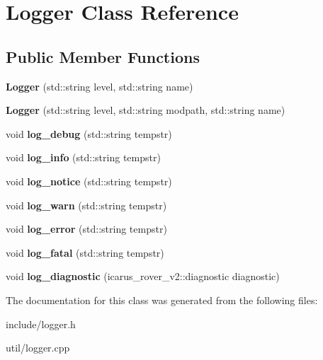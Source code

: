 \hypertarget{classLogger}{}\section{Logger Class Reference}
\label{classLogger}
\subsection*{Public Member Functions}
\begin{DoxyCompactItemize}
\item 
\mbox{\label{classLogger_a2d188aaeb90800faacb8ec0722ede338}} 
{\bfseries Logger} (std\+::string level, std\+::string name)
\item 
\mbox{\label{classLogger_a4072027f51624a468c537f55cb62e9a7}} 
{\bfseries Logger} (std\+::string level, std\+::string modpath, std\+::string name)
\item 
\mbox{\label{classLogger_a8ca921a63a5e0e576b864fb98dd99699}} 
void {\bfseries log\+\_\+debug} (std\+::string tempstr)
\item 
\mbox{\label{classLogger_a4718712d298c28cffde32bd6d8bc7671}} 
void {\bfseries log\+\_\+info} (std\+::string tempstr)
\item 
\mbox{\label{classLogger_a060a02512d6ef8274b344cba8c6a861a}} 
void {\bfseries log\+\_\+notice} (std\+::string tempstr)
\item 
\mbox{\label{classLogger_a8b0161b2a3435ea6ccd6d50c393d8968}} 
void {\bfseries log\+\_\+warn} (std\+::string tempstr)
\item 
\mbox{\label{classLogger_a0c4db5a58667bd9b6b55f937a43539fd}} 
void {\bfseries log\+\_\+error} (std\+::string tempstr)
\item 
\mbox{\label{classLogger_a848d7c2e0c554305792a4794d7cedc3c}} 
void {\bfseries log\+\_\+fatal} (std\+::string tempstr)
\item 
\mbox{\label{classLogger_a03e941dcc9cc5a4586961b50f99f5e94}} 
void {\bfseries log\+\_\+diagnostic} (icarus\+\_\+rover\+\_\+v2\+::diagnostic diagnostic)
\end{DoxyCompactItemize}


The documentation for this class was generated from the following files\+:\begin{DoxyCompactItemize}
\item 
include/logger.\+h\item 
util/logger.\+cpp\end{DoxyCompactItemize}
